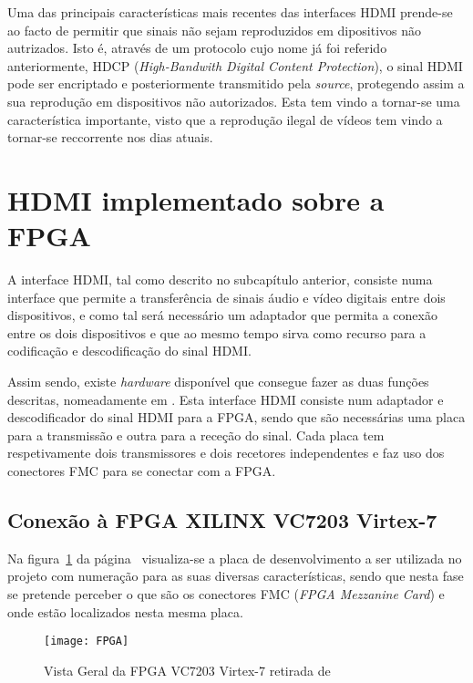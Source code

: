 Uma das principais características mais recentes das interfaces HDMI prende-se ao facto de permitir que sinais não sejam reproduzidos em dipositivos não autrizados. Isto é, através de um protocolo cujo nome já foi referido anteriormente, HDCP (\textit{High-Bandwith Digital Content Protection}), o sinal HDMI pode ser encriptado e posteriormente transmitido pela \textit{source}, protegendo assim a sua reprodução em dispositivos não autorizados. Esta tem vindo a tornar-se uma característica importante, visto que a reprodução ilegal de vídeos tem vindo a tornar-se reccorrente nos dias atuais.

\section{HDMI implementado sobre a FPGA}
A interface HDMI, tal como descrito no subcapítulo anterior, consiste numa interface que permite a transferência de sinais áudio e vídeo digitais entre dois dispositivos, e como tal será necessário um adaptador que permita a conexão entre os dois dispositivos e que ao mesmo tempo sirva como recurso para a codificação e descodificação do sinal HDMI. 

Assim sendo, existe \textit{hardware} disponível que consegue fazer as duas funções descritas, nomeadamente em \cite{R009}. Esta interface HDMI consiste num adaptador e descodificador do sinal HDMI para a FPGA, sendo que são necessárias uma placa para a transmissão e outra para a receção do sinal. Cada placa tem respetivamente dois transmissores e dois recetores independentes e faz uso dos conectores FMC para se conectar com a FPGA.

\subsection{Conexão à FPGA XILINX VC7203 Virtex-7} \label{batik} 
Na figura~\ref{fig:fpgaVistaGeral} da página~\pageref{fig:fpgaVistaGeral}  visualiza-se a placa de desenvolvimento a ser utilizada no projeto com numeração para as suas diversas características, sendo que nesta fase se pretende perceber o que são os conectores FMC (\textit{FPGA Mezzanine Card}) e onde estão localizados nesta mesma placa.

\begin{figure}[h!]
	\begin{center}
		\leavevmode
		\texttt{[image: FPGA]}
		\caption{Vista Geral da FPGA VC7203 Virtex-7 retirada de \cite{R008}}
		\label{fig:fpgaVistaGeral}
	\end{center}
\end{figure}

